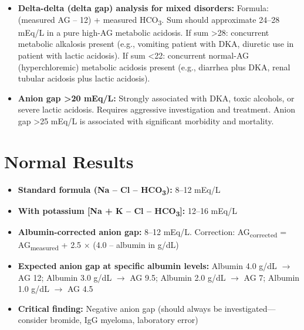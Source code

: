 \begin{itemize}
  \item \textbf{Delta-delta (delta gap) analysis for mixed disorders:} Formula: (measured AG -- 12) + measured HCO\textsubscript{3}. Sum should approximate 24--28 mEq/L in a pure high-AG metabolic acidosis. If sum >28: concurrent metabolic alkalosis present (e.g., vomiting patient with DKA, diuretic use in patient with lactic acidosis). If sum <22: concurrent normal-AG (hyperchloremic) metabolic acidosis present (e.g., diarrhea plus DKA, renal tubular acidosis plus lactic acidosis).
  \item \textbf{Anion gap >20 mEq/L:} Strongly associated with DKA, toxic alcohols, or severe lactic acidosis. Requires aggressive investigation and treatment. Anion gap >25 mEq/L is associated with significant morbidity and mortality.
\end{itemize}

\section*{Normal Results}
\begin{itemize}
  \item \textbf{Standard formula (Na -- Cl -- HCO\textsubscript{3}):} 8--12 mEq/L
  \item \textbf{With potassium [Na + K -- Cl -- HCO\textsubscript{3}]:} 12--16 mEq/L
  \item \textbf{Albumin-corrected anion gap:} 8--12 mEq/L. Correction: AG\textsubscript{corrected} = AG\textsubscript{measured} + 2.5 $\times$ (4.0 -- albumin in g/dL)
  \item \textbf{Expected anion gap at specific albumin levels:} Albumin 4.0 g/dL $\rightarrow$ AG 12; Albumin 3.0 g/dL $\rightarrow$ AG 9.5; Albumin 2.0 g/dL $\rightarrow$ AG 7; Albumin 1.0 g/dL $\rightarrow$ AG 4.5
  \item \textbf{Critical finding:} Negative anion gap (should always be investigated---consider bromide, IgG myeloma, laboratory error)
\end{itemize}

